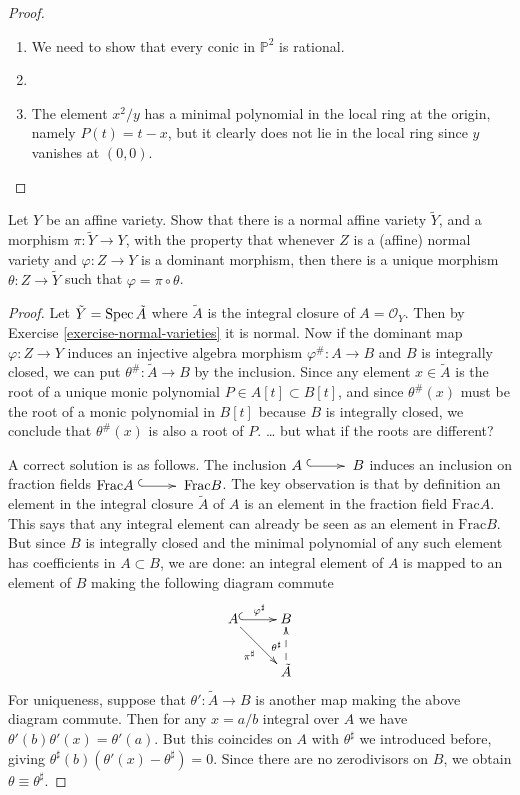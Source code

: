 \begin{proof}
\begin{enumerate}
\item We need to show that every conic
in $\mathbb{P}^2$ is rational.
\item
\item The element $x^2/y$ has a minimal
polynomial in the local ring at the origin,
namely $P(t)=t-x$, but it clearly
does not lie in the local ring since $y$
vanishes at $(0,0)$.
\end{enumerate}
\end{proof}

\begin{exercise}
\label{exercise-universal-prop-normalization}
Let $Y$ be an affine variety.
Show that there is a normal affine
variety $\tilde{Y}$, and a morphism
$\pi:\tilde{Y}\to Y$,
with the property that whenever $Z$
is a (affine) normal variety and 
$\varphi:Z \to Y$ is a dominant morphism,
then there is a unique morphism
$\theta:Z \to \tilde{Y}$ such that
$\varphi=\pi \circ \theta$.
\end{exercise}

\begin{proof}
Let $\tilde{Y}=\mathop{\mathrm{Spec}} \tilde{A}$
where $\tilde{A}$ is the integral closure
of $A=\mathcal{O}_Y$.
Then by Exercise
\ref{exercise-normal-varieties}
it is normal.
Now if the dominant map $\varphi:Z \to Y$
induces an injective algebra morphism
$\varphi^\#:A \to B$
and $B$ is integrally closed,
we can put $\theta^\#:\tilde{A} \to B$
by the inclusion.
Since any element $x \in \tilde{A}$
is the root of a unique monic polynomial
$P \in A[t] \subset B[t]$,
and since $\theta^\#(x)$ must be
the root of a monic polynomial in $B[t]$
because $B$ is integrally closed,
we conclude that $\theta^\#(x)$
is also a root of $P$.
… but what if the roots are different?

A correct solution is as follows.
The inclusion $A \xymatrix{\ar@{^{(}->}[r]&}
B$ induces an inclusion on fraction fields
$\text{Frac}A \xymatrix{\ar@{^{(}->}[r]&}
\text{Frac} B$.
The key observation is that by definition
an element in the integral closure 
$\tilde{A}$ of $A$ is an element in
the fraction field $\text{Frac} A$.
This says that any integral element
can already be seen as an element in
$\text{Frac}B$.
But since $B$ is integrally closed and the
minimal polynomial of any such element
has coefficients in $A \subset B$,
we are done: an integral element of $A$
is mapped to an element of $B$ making
the following diagram commute
$$
\xymatrix{
A\ar[dr]_{\pi^\sharp}
\ar@{^{(}->}[r]^{\varphi^\sharp}
&  B\\
&  \tilde{A}\ar@{-->}[u]^{\theta^\sharp}
}
$$
For uniqueness, suppose that
$\theta':\tilde{A} \to B$ is another
map making the above diagram commute.
Then for any $x=a/b$ integral over $A$ 
we have
$\theta'(b)\theta'(x)=\theta'(a)$.
But this coincides on $A$
with $\theta^\sharp$
we introduced before, giving
$\theta^\sharp(b)(\theta'(x)-\theta^\sharp)
=0$. Since there are no zerodivisors on $B$,
we obtain $\theta\equiv\theta^\sharp$.
\end{proof}


